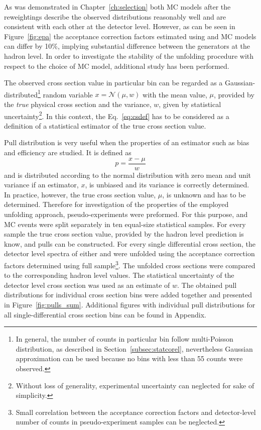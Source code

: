 As was demonstrated in Chapter~\ref{ch:selection} both MC models after the reweightings describe the observed distributions reasonably well and are consistent with each other at the detector level. However, as can be seen in Figure~\ref{fig:epa} the acceptance correction factors estimated using \ariadne and \lepto MC models can differ by 10\%, implying substantial difference between the generators at the hadron level. In order to investigate the stability of the unfolding procedure with respect to the choice of MC model, additional study has been performed.

The observed cross section value in particular bin can be regarded as a Gaussian-distributed\footnote{In general, the number of counts in particular bin follow multi-Poisson distribution, as described in Section~\ref{subsec:statcorel}, nevertheless Gaussian approximation can be used because no bins with less than 55 counts were observed.} random variable $x = \mathcal{N}\left(\mu,w\right)$ with the mean value, $\mu$, provided by the \textit{true} physical cross section and the variance, $w$, given by statistical uncertainty\footnote{Without loss of generality, experimental uncertainty can neglected for sake of simplicity.}. In this context, the Eq.~\eqref{eq:csdef} has to be considered as a definition of a statistical estimator of the true cross section value.

Pull distribution is very useful when the properties of an estimator such as bias and efficiency are studied. It is defined as 
\begin{equation}
p=\frac{x-\mu}{w}
\label{eq:pulldef}
\end{equation}
and is distributed according to the normal distribution with zero mean and unit variance if an estimator, $x$, is unbiased and its variance is correctly determined. In practice, however, the true cross section value, $\mu$, is unknown and has to be determined. Therefore for investigation of the properties of the employed unfolding approach, pseudo-experiments were preformed. For this purpose, \lepto and \ariadne MC events were split separately in ten equal-size statistical samples. For every sample the true cross section value, provided by the hadron level prediction is know, and pulls can be constructed. For every single differential cross section, the detector level spectra of either \lepto and \ariadne were unfolded using the acceptance correction factors determined using full \lepto sample\footnote{Small correlation between the acceptance correction factors and detector-level number of counts in \lepto pseudo-experiment samples can be neglected.}. The unfolded cross sections were compared to the corresponding hadron level values. The statistical uncertainty of the detector level cross section was used as an estimate of $w$. The obtained pull distributions for individual cross section bins were added together and presented in Figure~\ref{fig:pulls_sum}. Additional figures with individual pull distributions for all single-differential cross section bins can be found in Appendix.

